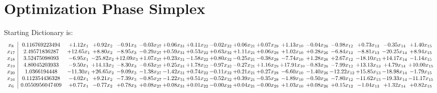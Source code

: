 \documentclass[9pt]{article}
\begin{document}
\section{Optimization Phase Simplex}
Starting Dictionary is:
\[\begin{array}{c| c c@{\hskip 2pt} c@{\hskip 2pt} c@{\hskip 2pt} c@{\hskip 2pt} c@{\hskip 2pt} c@{\hskip 2pt} c@{\hskip 2pt} c@{\hskip 2pt} c@{\hskip 2pt} c@{\hskip 2pt} c@{\hskip 2pt} c@{\hskip 2pt} c@{\hskip 2pt} c@{\hskip 2pt} c@{\hskip 2pt} }
 x_{8}   &  0.116769223494 & +  1.12 x_{1} & +  0.92 x_{2} & -0.91 x_{3} & -0.03 x_{27} & +  0.06 x_{31} & +  0.11 x_{22} & -0.02 x_{32} & +  0.06 x_{21} & +  0.07 x_{29} & +  1.13 x_{10} & -0.04 x_{26} & -0.98 x_{12} & +  0.73 x_{13} & -0.35 x_{14} & +  1.40 x_{15}\\
 x_{17}   &  2.49571836287 & + 12.65 x_{1} & +  8.80 x_{2} & -8.95 x_{3} & -0.29 x_{27} & +  0.59 x_{31} & +  0.53 x_{22} & +  0.63 x_{32} & +  1.11 x_{21} & +  0.06 x_{29} & +  1.02 x_{10} & +  0.28 x_{26} & -6.84 x_{12} & -8.81 x_{13} & -20.25 x_{14} & +  8.94 x_{15}\\
 x_{18}   &  3.52475098093 & -6.95 x_{1} & -25.82 x_{2} & + 12.09 x_{3} & +  1.07 x_{27} & +  0.23 x_{31} & -1.58 x_{22} & +  0.80 x_{32} & -0.25 x_{21} & -0.38 x_{29} & -7.74 x_{10} & +  1.28 x_{26} & +  2.67 x_{12} & -18.10 x_{13} & + 14.17 x_{14} & -1.14 x_{15}\\
 x_{19}   &  4.80045203933 & -9.50 x_{1} & + 14.13 x_{2} & -8.30 x_{3} & -0.63 x_{27} & +  0.25 x_{31} & +  1.78 x_{22} & -0.97 x_{32} & -0.27 x_{21} & +  1.16 x_{29} & + 17.91 x_{10} & -0.83 x_{26} & -7.99 x_{12} & + 13.13 x_{13} & +  4.79 x_{14} & + 10.00 x_{15}\\
 x_{20}   &  1.0366194448 & -11.30 x_{1} & + 26.65 x_{2} & -9.09 x_{3} & -1.38 x_{27} & -1.42 x_{31} & +  0.74 x_{22} & -0.11 x_{32} & +  0.21 x_{21} & +  0.27 x_{29} & -6.60 x_{10} & -1.40 x_{26} & -12.22 x_{12} & + 15.85 x_{13} & -18.98 x_{14} & -1.79 x_{15}\\
 x_{16}   &  0.112354436328 & -4.02 x_{1} & +  9.21 x_{2} & -7.39 x_{3} & -0.85 x_{27} & -1.22 x_{31} & +  0.51 x_{22} & -0.52 x_{32} & +  0.39 x_{21} & -0.35 x_{29} & -1.89 x_{10} & -0.50 x_{26} & -7.80 x_{12} & -11.62 x_{13} & -19.33 x_{14} & -11.17 x_{15}\\
 x_{6}   &  0.0550956047409 & +  0.77 x_{1} & -0.77 x_{2} & +  0.78 x_{3} & +  0.08 x_{27} & +  0.08 x_{31} & +  0.01 x_{22} & -0.00 x_{32} & +  0.04 x_{21} & -0.00 x_{29} & +  1.03 x_{10} & +  0.08 x_{26} & +  0.15 x_{12} & -1.04 x_{13} & +  1.32 x_{14} & +  0.82 x_{15}\\

\end{array}\]
\end{document}
